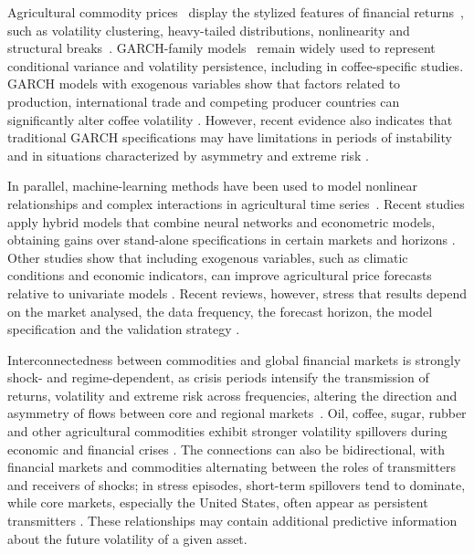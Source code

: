 \documentclass[a4paper,fleqn]{cas-sc}
\begin{document}
Agricultural commodity prices~\citep{hamulczuk2026price,Manogna2025HybridVolatility,Jin2026} display the stylized features of financial returns~\citep{Cont2001}, such as volatility clustering, heavy-tailed distributions, nonlinearity and structural breaks~\citep{S0957417426013771}. GARCH-family models~\citep{Bollerslev1986GARCH,S0165188925000946} remain widely used to represent conditional variance and volatility persistence, including in coffee-specific studies. GARCH models with exogenous variables show that factors related to production, international trade and competing producer countries can significantly alter coffee volatility \citep{Chaovanapoonphol2023CoffeeGARCHX}. However, recent evidence also indicates that traditional GARCH specifications may have limitations in periods of instability and in situations characterized by asymmetry and extreme risk \citep{Brun2026GARCHCoffeeRisk}.

In parallel, machine-learning methods have been used to model nonlinear relationships and complex interactions in agricultural time series~\citep{105033941897,Zhang2025ClimateRealizedVolatility,Jin2024CoffeePriceML}. Recent studies apply hybrid models that combine neural networks and econometric models, obtaining gains over stand-alone specifications in certain markets and horizons \citep{Manogna2025HybridVolatility,S246822762500420X}. Other studies show that including exogenous variables, such as climatic conditions and economic indicators, can improve agricultural price forecasts relative to univariate models \citep{Nayak2024ExogenousAgricultural,Zhang2025ClimateRealizedVolatility,Pandit2024CEEMDANTDNN}. Recent reviews, however, stress that results depend on the market analysed, the data frequency, the forecast horizon, the model specification and the validation strategy \citep{Guindani2024AgriculturalForecasting}.

Interconnectedness between commodities and global financial markets is strongly shock- and regime-dependent, as crisis periods intensify the transmission of returns, volatility and extreme risk across frequencies, altering the direction and asymmetry of flows between core and regional markets~\citep{105008757196,84155181176,84901841234,85047926946}. Oil, coffee, sugar, rubber and other agricultural commodities exhibit stronger volatility spillovers during economic and financial crises \citep{Singh2026OilSoftCommoditySpillovers}. The connections can also be bidirectional, with financial markets and commodities alternating between the roles of transmitters and receivers of shocks; in stress episodes, short-term spillovers tend to dominate, while core markets, especially the United States, often appear as persistent transmitters \citep{Zhou2026CommodityConnectedness}. These relationships may contain additional predictive information about the future volatility of a given asset.
\end{document}
